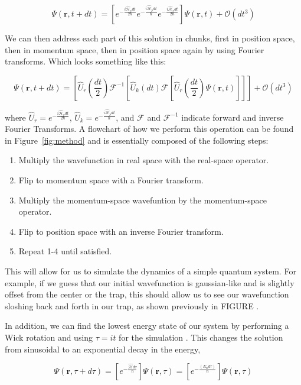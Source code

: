 $$
\Psi(\mathbf{r},t+dt) = \left[e^{-\frac{i\mathcal{\hat{H}}_vdt}{2\hbar}}e^{-\frac{i\mathcal{\hat{H}}_pdt}{\hbar}}e^{-\frac{i\mathcal{\hat{H}}_vdt}{2\hbar}} \right]\Psi(\mathbf{r},t) + \mathcal{O}(dt^3)
$$

\noindent We can then address each part of this solution in chunks, first in position space, then in momentum space, then in position space again by using Fourier transforms.
Which looks something like this:

$$
\Psi(\mathbf{r}, t+dt) = \left[\hat{U}_r\left(\frac{dt}{2}\right)\mathcal{F}^{-1}\left[\hat{U}_k(dt) \mathcal{F} \left[\hat{U}_r\left(\frac{dt}{2}\right) \Psi(\mathbf{r},t) \right] \right] \right] + \mathcal{O}(dt^3)
$$

where $\hat{U}_r = e^{-\frac{i\mathcal{\hat{H}}_vdt}{2\hbar}}$, $\hat{U}_k = e^{-\frac{i\mathcal{\hat{H}}_pdt}{\hbar}}$, and $\mathcal{F}$ and $\mathcal{F}^{-1}$ indicate forward and inverse Fourier Transforms.
A flowchart of how we perform this operation can be found in Figure~\ref{fig:method} and is essentially composed of the following steps:

\begin{enumerate}
\item Multiply the wavefunction in real space with the real-space operator.
\item Flip to momentum space with a Fourier transform.
\item Multiply the momentum-space wavefuntion by the momentum-space operator.
\item Flip to position space with an inverse Fourier transform.
\item Repeat 1-4 until satisfied.
\end{enumerate}

This will allow for us to simulate the dynamics of a simple quantum system.
For example, if we guess that our initial wavefunction is gaussian-like and is slightly offset from the center or the trap, this should allow us to see our wavefunction sloshing back and forth in our trap, as shown previously in FIGURE .

In addition, we can find the lowest energy state of our system by performing a Wick rotation and using $\tau = it$ for the simulation .
This changes the solution from sinusoidal to an exponential decay in the energy,

$$
\Psi(\mathbf{r},\tau + d\tau) = \left[e^{-\frac{\mathcal{\hat{H}}d\tau}{\hbar}}\right]\Psi(\mathbf{r},\tau) = \left[e^{-\frac{(E_n d\tau)}{\hbar}}\right]\Psi(\mathbf{r},\tau)
$$

